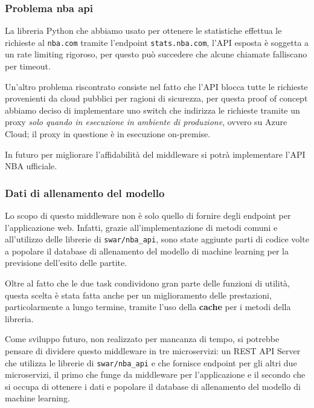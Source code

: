 \subsubsection{Problema nba api}

La libreria Python che abbiamo usato per ottenere le statistiche effettua le richieste al \texttt{nba.com} tramite l'endpoint \texttt{stats.nba.com}, l'API esposta è soggetta a un rate limiting rigoroso, per questo può succedere che alcune chiamate falliscano per timeout.

Un'altro problema riscontrato consiste nel fatto che l'API blocca tutte le richieste provenienti da cloud pubblici per ragioni di sicurezza, per questa proof of concept abbiamo deciso di implementare uno switch che indirizza le richieste tramite un proxy \textit{solo quando in esecuzione in ambiente di produzione}, ovvero su Azure Cloud; il proxy in questione è in esecuzione on-premise.

In futuro per migliorare l'affidabilità del middleware si potrà implementare l'API NBA ufficiale.

\subsubsection{Dati di allenamento del modello}
Lo scopo di questo middleware non è solo quello di fornire degli endpoint per l'applicazione web. Infatti, grazie all'implementazione di metodi comuni e all'utilizzo delle librerie di \texttt{swar/nba\_api}, sono state aggiunte parti di codice volte a popolare il database di allenamento del modello di machine learning per la previsione dell'esito delle partite.

Oltre al fatto che le due task condividono gran parte delle funzioni di utilità, questa scelta è stata fatta anche per un miglioramento delle prestazioni, particolarmente a lungo termine, tramite l'uso della \textbf{cache} per i metodi della libreria.

Come sviluppo futuro, non realizzato per mancanza di tempo, si potrebbe pensare di dividere questo middleware in tre microservizi: un REST API Server che utilizza le librerie di \texttt{swar/nba\_api} e che fornisce endpoint per gli altri due microservizi, il primo che funge da middleware per l'applicazione e il secondo che si occupa di ottenere i dati e popolare il database di allenamento del modello di machine learning.
\newpage
